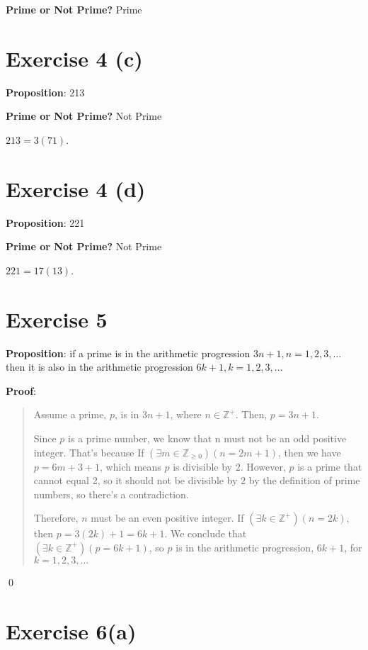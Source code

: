 \documentclass{article} %
\begin{document}
\bigskip
\noindent
\textbf{Prime or Not Prime?} Prime
\bigskip

\section*{Exercise 4 (c)}

\bigskip
\noindent
\textbf{Proposition}: 213

\bigskip
\noindent
\textbf{Prime or Not Prime?} Not Prime

$213 = 3 (71)$.
\bigskip

\section*{Exercise 4 (d)}

\bigskip
\noindent
\textbf{Proposition}: 221

\bigskip
\noindent
\textbf{Prime or Not Prime?} Not Prime

$221 = 17 (13)$.
\bigskip

\section*{Exercise 5}

\bigskip
\noindent
\textbf{Proposition}: if a prime is in the arithmetic progression $3n + 1, n = 1, 2, 3, \dots$
then it is also in the arithmetic progression $6k + 1, k = 1, 2, 3, \dots$

\bigskip
\noindent
\textbf{Proof}:
\begin{quote}

    Assume a prime, $p$, is in $3n + 1$, where $n \in \mathbb{Z}^+$. Then, $p = 3n + 1$.

    Since $p$ is a prime number, we know that n must not be an odd positive integer. That's because If $(\exists m \in \mathbb{Z}_{\geq 0})(n = 2m + 1)$, then we have $p = 6m + 3 + 1$, which means $p$ is divisible by $2$. However, $p$ is a prime that cannot equal 2, so it should not be divisible by $2$ by the definition of prime numbers, so there's a contradiction.

    Therefore, $n$ must be an even positive integer. If $(\exists k \in \mathbb{Z}^+)(n = 2k)$, then $p = 3(2k) + 1 = 6k + 1$. We conclude that $(\exists k \in \mathbb{Z}^+)(p = 6k + 1)$, so $p$ is in the arithmetic progression, $6k + 1$, for $k = 1, 2, 3, \dots$
\end{quote}
\qed
\bigskip

\section*{Exercise 6(a)}
\end{document}
